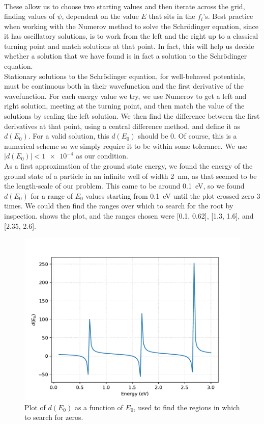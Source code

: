 \documentclass[11pt]{article}
\begin{document}
\begin{enumerate}
\begin{enumerate}
\begin{align}
        \end{align}
        These allow us to choose two starting values and then iterate across the grid, finding values of $\psi$, dependent on the value $E$ that sits in the $f_i$'s. Best practice when working with the Numerov method to solve the Schr\"odinger equation, since it has oscillatory solutions, is to work from the left and the right up to a classical turning point and match solutions at that point. In fact, this will help us decide whether a solution that we have found is in fact a solution to the Schr\"odinger equation. \\
        Stationary solutions to the Schr\"odinger equation, for well-behaved potentials, must be continuous both in their wavefunction and the first derivative of the wavefunction. For each energy value we try, we use Numerov to get a left and right solution, meeting at the turning point, and then match the value of the solutions by scaling the left solution. We then find the difference between the first derivatives at that point, using a central difference method, and define it as $d(E_0)$. For a valid solution, this $d(E_0)$ should be 0. Of course, this is a numerical scheme so we simply require it to be within some tolerance. We use $|d(E_0)|<\num{1e-4}$ as our condition. \\
        As a first approximation of the ground state energy, we found the energy of the ground state of a particle in an infinite well of width \SI{2}{\nano\metre}, as that seemed to be the length-scale of our problem. This came to be around \SI{0.1}{\electronvolt}, so we found $d(E_0)$ for a range of $E_0$ values starting from \SI{0.1}{\electronvolt} until the plot crossed zero 3 times. We could then find the ranges over which to search for the root by inspection.  shows the plot, and the ranges chosen were [0.1, 0.62], [1.3, 1.6], and [2.35, 2.6].

        \begin{figure}[h]
            \begin{center}
                \includegraphics[width=.6\textwidth]{Plots/q2extra.pdf}
                \caption{Plot of $d(E_0)$ as a function of $E_0$, used to find the regions in which to search for zeros.}
                \label{fig:q2extra}
            \end{center}
        \end{figure}


\end{enumerate}
\end{enumerate}
\end{document}
